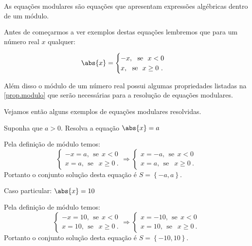    \vskip0.3cm
 \colorbox{azul}{
 \begin{minipage}{0.9\linewidth}
 \begin{center}
  As equações modulares são equações que apresentam expressões algébricas dentro de um módulo.
 \end{center}
 \end{minipage}}
 \vskip0.3cm

 Antes de começarmos a ver exemplos destas equações lembremos que para um número real $x$ qualquer:

 \[
\abs{x}= \begin{cases}
      -x, \ \ \text{se} \ \ x<0 \\
      x, \ \ \text{se} \ \ x \geq 0 \ .
     \end{cases}
\]

Além disso o módulo de um número real possui algumas propriedades listadas na \autoref{prop.modulo} que serão necessárias para a resolução de equações modulares.

Vejamos então alguns exemplos de equações modulares resolvidas.

\begin{exem} 
  Suponha que $a> 0$. Resolva a equação $\abs{x}= a$

  Pela definição de módulo temos:
  \[
  \begin{cases}
      -x= a, \ \ \text{se} \ \ x<0 \\
      x= a, \ \ \text{se } \ \ x \geq 0 \ .
     \end{cases}
     \Rightarrow
     \begin{cases}
      x= -a, \ \ \text{se} \ \ x<0 \\
      x= a, \ \ \text{se } \ \ x \geq 0 \ .
     \end{cases}
  \]
 Portanto o conjunto solução desta equação é $S= \left\{-a, a \right\}$.
\end{exem}

\begin{exem}
  Caso particular: $\abs{x}= 10$

  Pela definição de módulo temos:
  \[
  \begin{cases}
      -x= 10, \ \ \text{se} \ \ x<0 \\
      x= 10, \ \ \text{se } \ \ x \geq 0 \ .
     \end{cases}
     \Rightarrow
     \begin{cases}
      x= -10, \ \ \text{se} \ \ x<0 \\
      x= 10, \ \ \text{se } \ \ x \geq 0 \ .
     \end{cases}
  \]
 Portanto o conjunto solução desta equação é $S= \left\{-10, 10 \right\}$.
\end{exem}

